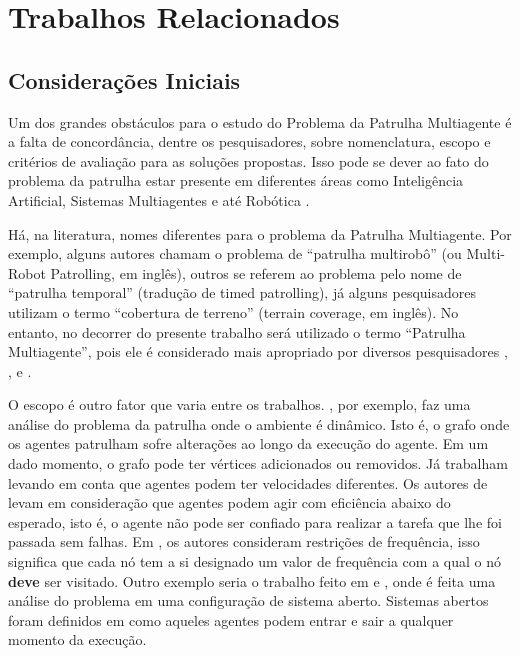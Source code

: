 \chapter{Trabalhos Relacionados}
\label{chp:background}

\section{Considerações Iniciais}

Um dos grandes obstáculos para o estudo do Problema da Patrulha Multiagente é a 
falta de concordância, dentre os pesquisadores, sobre nomenclatura, escopo e 
critérios de avaliação para as soluções propostas. Isso pode se dever ao fato do 
problema da patrulha estar presente em diferentes áreas como Inteligência 
Artificial, Sistemas Multiagentes e até Robótica \citep{sampaiophd}.

Há, na literatura, nomes diferentes para o problema da Patrulha Multiagente. Por 
exemplo, alguns autores \citep{hernandez2013game} chamam o problema de “patrulha 
multirobô” (ou Multi-Robot Patrolling, em inglês), outros \citep{6495145} se 
referem ao problema pelo nome de “patrulha temporal” (tradução de timed 
patrolling), já alguns pesquisadores \citep{Koenig:2001:TCA:375735.376463} 
utilizam o termo “cobertura de terreno” (terrain coverage, em inglês). No 
entanto, no decorrer do presente trabalho será utilizado o termo “Patrulha 
Multiagente”, pois ele é considerado mais apropriado por diversos pesquisadores 
\citep{6900280}, \citep{sampaiophd}, \citep{hernandez2013game} e \citep{6315145}.

O escopo é outro fator que varia entre os trabalhos. \citep{6615158}, por 
exemplo, faz uma análise do problema da patrulha onde o ambiente é dinâmico. 
Isto é, o grafo onde os agentes patrulham sofre alterações ao longo da execução 
do agente. Em um dado momento, o grafo pode ter vértices adicionados ou 
removidos. Já \citep{6900280} trabalham levando em conta que agentes podem ter 
velocidades diferentes. Os autores de \citep{Pippin:2013:PBT:2480362.2480378} 
levam em consideração que agentes podem agir com eficiência abaixo do esperado, 
isto é, o agente não pode ser confiado para realizar a tarefa que lhe foi 
passada sem falhas. Em \citep{4209122}, os autores consideram restrições de 
frequência, isso significa que cada nó tem a si designado um valor de frequência 
com a qual o nó \textbf{deve} ser visitado. Outro exemplo seria o trabalho feito 
em \citep{6495145} e \citep{Poulet:2012:b}, onde é feita uma análise do problema 
em uma configuração de sistema aberto. Sistemas abertos foram definidos em 
\citep{6040660} como aqueles agentes podem entrar e sair a qualquer momento da 
execução.

